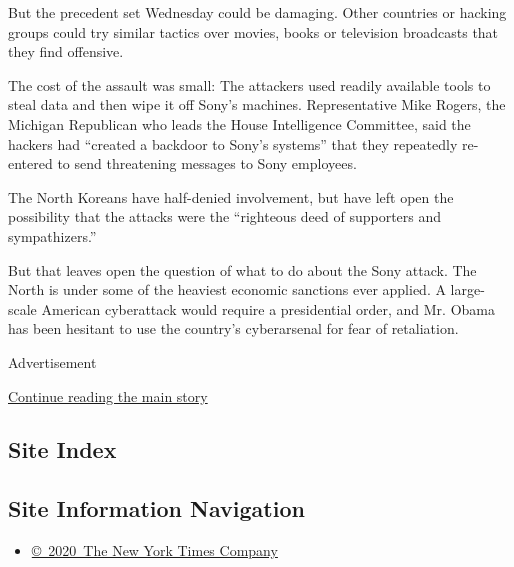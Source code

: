 But the precedent set Wednesday could be damaging. Other countries or
hacking groups could try similar tactics over movies, books or
television broadcasts that they find offensive.

The cost of the assault was small: The attackers used readily available
tools to steal data and then wipe it off Sony's machines. Representative
Mike Rogers, the Michigan Republican who leads the House Intelligence
Committee, said the hackers had ``created a backdoor to Sony's systems''
that they repeatedly re-entered to send threatening messages to Sony
employees.

The North Koreans have half-denied involvement, but have left open the
possibility that the attacks were the ``righteous deed of supporters and
sympathizers.''

But that leaves open the question of what to do about the Sony attack.
The North is under some of the heaviest economic sanctions ever applied.
A large-scale American cyberattack would require a presidential order,
and Mr. Obama has been hesitant to use the country's cyberarsenal for
fear of retaliation.

Advertisement

\protect\hyperlink{after-bottom}{Continue reading the main story}

\hypertarget{site-index}{%
\subsection{Site Index}\label{site-index}}

\hypertarget{site-information-navigation}{%
\subsection{Site Information
Navigation}\label{site-information-navigation}}

\begin{itemize}
\tightlist
\item
  \href{https://help.nytimes3xbfgragh.onion/hc/en-us/articles/115014792127-Copyright-notice}{©~2020~The
  New York Times Company}
\end{itemize}

